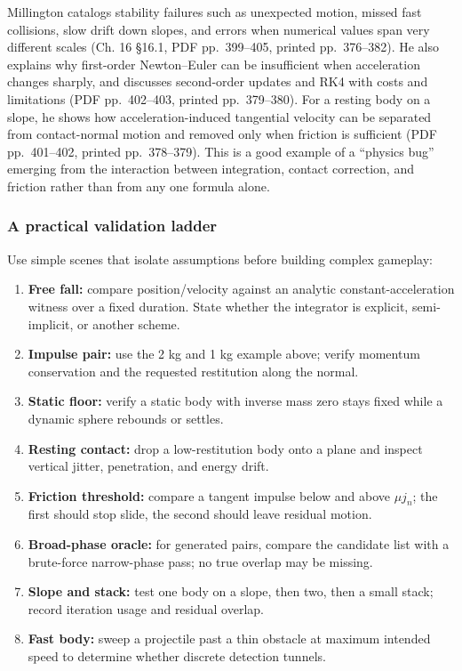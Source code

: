 Millington catalogs stability failures such as unexpected motion, missed fast collisions, slow drift down slopes, and errors when numerical values span very different scales (Ch. 16 §16.1, PDF pp.~399--405, printed pp.~376--382). He also explains why first-order Newton--Euler can be insufficient when acceleration changes sharply, and discusses second-order updates and RK4 with costs and limitations (PDF pp.~402--403, printed pp.~379--380). For a resting body on a slope, he shows how acceleration-induced tangential velocity can be separated from contact-normal motion and removed only when friction is sufficient (PDF pp.~401--402, printed pp.~378--379). This is a good example of a ``physics bug'' emerging from the interaction between integration, contact correction, and friction rather than from any one formula alone.

\subsubsection{A practical validation ladder}\label{06-engine-ii-ch033-a-practical-validation-ladder}

Use simple scenes that isolate assumptions before building complex gameplay:

\begin{enumerate}
\def\labelenumi{\arabic{enumi}.}
\tightlist
\item
  \textbf{Free fall:} compare position/velocity against an analytic constant-acceleration witness over a fixed duration. State whether the integrator is explicit, semi-implicit, or another scheme.
\item
  \textbf{Impulse pair:} use the 2 kg and 1 kg example above; verify momentum conservation and the requested restitution along the normal.
\item
  \textbf{Static floor:} verify a static body with inverse mass zero stays fixed while a dynamic sphere rebounds or settles.
\item
  \textbf{Resting contact:} drop a low-restitution body onto a plane and inspect vertical jitter, penetration, and energy drift.
\item
  \textbf{Friction threshold:} compare a tangent impulse below and above \(\mu j_n\); the first should stop slide, the second should leave residual motion.
\item
  \textbf{Broad-phase oracle:} for generated pairs, compare the candidate list with a brute-force narrow-phase pass; no true overlap may be missing.
\item
  \textbf{Slope and stack:} test one body on a slope, then two, then a small stack; record iteration usage and residual overlap.
\item
  \textbf{Fast body:} sweep a projectile past a thin obstacle at maximum intended speed to determine whether discrete detection tunnels.
\end{enumerate}

